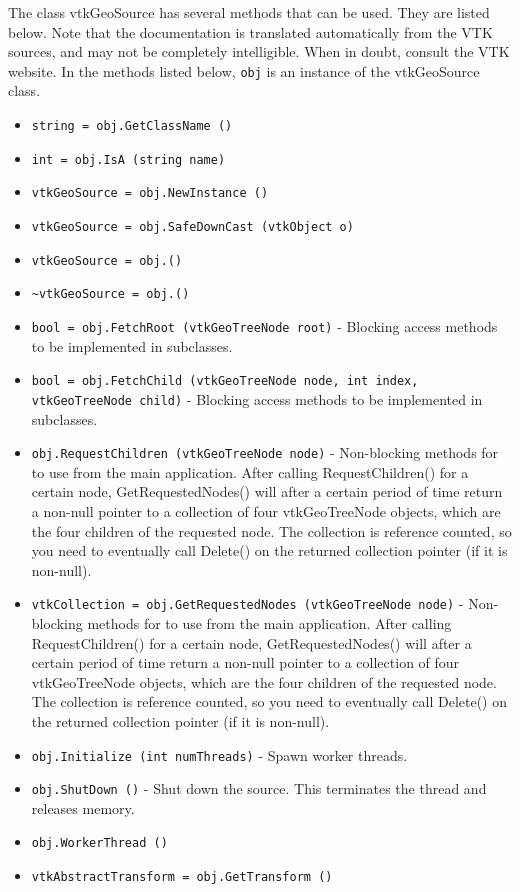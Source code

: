 The class vtkGeoSource has several methods that can be used.
  They are listed below.
Note that the documentation is translated automatically from the VTK sources,
and may not be completely intelligible.  When in doubt, consult the VTK website.
In the methods listed below, \verb|obj| is an instance of the vtkGeoSource class.
\begin{itemize}
\item  \verb|string = obj.GetClassName ()|

\item  \verb|int = obj.IsA (string name)|

\item  \verb|vtkGeoSource = obj.NewInstance ()|

\item  \verb|vtkGeoSource = obj.SafeDownCast (vtkObject o)|

\item  \verb|vtkGeoSource = obj.()|

\item  \verb|~vtkGeoSource = obj.()|

\item  \verb|bool = obj.FetchRoot (vtkGeoTreeNode root)| -  Blocking access methods to be implemented in subclasses.

\item  \verb|bool = obj.FetchChild (vtkGeoTreeNode node, int index, vtkGeoTreeNode child)| -  Blocking access methods to be implemented in subclasses.

\item  \verb|obj.RequestChildren (vtkGeoTreeNode node)| -  Non-blocking methods for to use from the main application.
 After calling RequestChildren() for a certain node,
 GetRequestedNodes() will after a certain period of time return a
 non-null pointer to a collection of four vtkGeoTreeNode objects,
 which are the four children of the requested node.
 The collection is reference counted, so you need to eventually
 call Delete() on the returned collection pointer (if it is non-null).

\item  \verb|vtkCollection = obj.GetRequestedNodes (vtkGeoTreeNode node)| -  Non-blocking methods for to use from the main application.
 After calling RequestChildren() for a certain node,
 GetRequestedNodes() will after a certain period of time return a
 non-null pointer to a collection of four vtkGeoTreeNode objects,
 which are the four children of the requested node.
 The collection is reference counted, so you need to eventually
 call Delete() on the returned collection pointer (if it is non-null).

\item  \verb|obj.Initialize (int numThreads)| -  Spawn worker threads. 

\item  \verb|obj.ShutDown ()| -  Shut down the source. This terminates the thread and releases memory.

\item  \verb|obj.WorkerThread ()|

\item  \verb|vtkAbstractTransform = obj.GetTransform ()|

\end{itemize}
